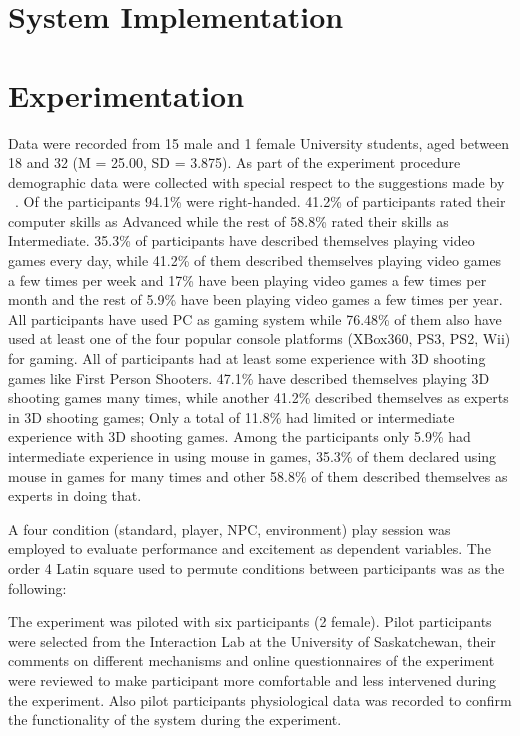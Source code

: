 \documentclass[conference]{include/IEEEtran}
\begin{document}

\section{System Implementation}
\label{sec:impl}


\section{Experimentation}
\label{sec:exprm}

Data were recorded from 15 male and 1 female University students, aged between 18 and 32 (M = 25.00, SD = 3.875). As part of the experiment procedure demographic data were collected with special respect to the suggestions made by ~\cite{?}. Of the participants 94.1\% were right-handed. 41.2\% of participants rated their computer skills as Advanced while the rest of 58.8\% rated their skills as Intermediate. 35.3\% of participants have described themselves playing video games every day, while 41.2\% of them described themselves playing video games a few times per week and 17\% have been playing video games a few times per month and the rest of 5.9\% have been playing video games a few times per year. All participants have used PC as gaming system while 76.48\% of them also have used at least one of the four popular console platforms (XBox360, PS3, PS2, Wii) for gaming. All of participants had at least some experience with 3D shooting games like First Person Shooters. 47.1\% have described themselves playing 3D shooting games many times, while another 41.2\% described themselves as experts in 3D shooting games; Only a total of 11.8\% had limited or intermediate experience with 3D shooting games. Among the participants only 5.9\% had intermediate experience in using mouse in games, 35.3\% of them declared using mouse in games for many times and other 58.8\% of them described themselves as experts in doing that.

A four condition (standard, player, NPC, environment) play session was employed to evaluate performance and excitement as dependent variables. The order 4 Latin square used to permute conditions between participants was as the following:

The experiment was piloted with six participants (2 female). Pilot participants were selected from the Interaction Lab at the University of Saskatchewan, their comments on different mechanisms and online questionnaires of the experiment were reviewed to make participant more comfortable and less intervened during the experiment. Also pilot participants physiological data was recorded to confirm the functionality of the system during the experiment.
\end{document}

